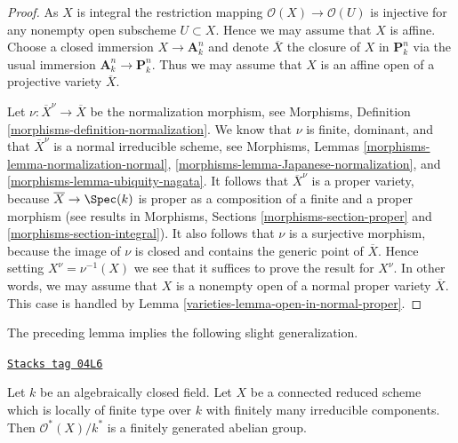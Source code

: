 \begin{proof}

As $X$ is integral the restriction mapping
$\mathcal{O}(X) \to \mathcal{O}(U)$ is injective for any
nonempty open subscheme $U \subset X$. Hence we may assume
that $X$ is affine. Choose a closed immersion
$X \to \mathbf{A}^n_k$
and denote $\overline{X}$ the closure of $X$ in $\mathbf{P}^n_k$
via the usual immersion $\mathbf{A}^n_k \to \mathbf{P}^n_k$.
Thus we may assume that $X$ is an affine open of a projective
variety $\overline{X}$.

\medskip\noindent
Let $\nu : \overline{X}^\nu \to \overline{X}$ be the normalization
morphism, see
Morphisms, Definition \ref{morphisms-definition-normalization}.
We know that $\nu$ is finite, dominant, and that $\overline{X}^\nu$
is a normal irreducible scheme, see
Morphisms, Lemmas \ref{morphisms-lemma-normalization-normal},
\ref{morphisms-lemma-Japanese-normalization}, and
\ref{morphisms-lemma-ubiquity-nagata}.
It follows that $\overline{X}^\nu$ is a proper variety,
because $\overline{X} \to \Spec(k)$ is proper as a composition
of a finite and a proper morphism (see results in
Morphisms, Sections \ref{morphisms-section-proper} and
\ref{morphisms-section-integral}).
It also follows that $\nu$ is a surjective morphism, because
the image of $\nu$ is closed and contains the generic point of $\overline{X}$.
Hence setting $X^\nu = \nu^{-1}(X)$ we see that it suffices to prove the
result for $X^\nu$. In other words, we may assume that $X$ is a nonempty
open of a normal proper variety $\overline{X}$. This case is handled by
Lemma \ref{varieties-lemma-open-in-normal-proper}.
\end{proof}

The preceding lemma implies the following slight generalization.

\begin{lemma}
\label{varieties-lemma-units-general-algebraically-closed}
\href{https://stacks.math.columbia.edu/tag/04L6}{\texttt{Stacks tag 04L6}}

Let $k$ be an algebraically closed field.
Let $X$ be a connected reduced scheme which is locally of finite type
over $k$ with finitely many irreducible components.
Then $\mathcal{O}^*(X)/k^*$ is a finitely generated abelian group.
\end{lemma}

